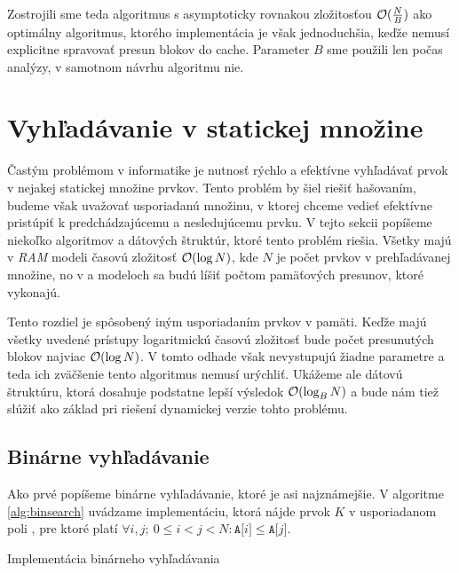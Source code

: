 Zostrojili sme teda \obliv algoritmus s asymptoticky rovnakou zložitosťou $\mathcal{O}(\frac{N}{B})$ ako optimálny \aware algoritmus, ktorého implementácia je však jednoduchšia, keďže nemusí explicitne spravovať presun blokov do cache. Parameter $B$ sme použili len počas analýzy, v samotnom návrhu algoritmu nie.

\section{Vyhľadávanie v statickej množine}
Častým problémom v informatike je nutnosť rýchlo a efektívne vyhľadávať prvok v nejakej statickej množine prvkov. Tento problém by šiel riešiť hašovaním, budeme však uvažovať usporiadanú množinu, v ktorej chceme vedieť efektívne pristúpiť k predchádzajúcemu a nesledujúcemu prvku. V tejto sekcii popíšeme niekoľko algoritmov a dátových štruktúr, ktoré tento problém riešia. Všetky majú v \emph{RAM} modeli časovú zložitosť $\mathcal{O}(\log N)$, kde $N$ je počet prvkov v prehľadávanej množine, no v \aware a \obliv modeloch sa budú líšiť počtom pamäťových presunov, ktoré vykonajú.

Tento rozdiel je spôsobený iným usporiadaním prvkov v pamäti. Keďže majú všetky uvedené prístupy logaritmickú časovú zložitosť bude počet presunutých blokov najviac $\mathcal{O}(\log{N})$. V tomto odhade však nevystupujú žiadne parametre \cache a teda ich zväčšenie tento algoritmus nemusí urýchliť. Ukážeme ale dátovú štruktúru, ktorá dosahuje podstatne lepší výsledok $\mathcal{O}(\log_B{N})$ a bude nám tiež slúžiť ako základ pri riešení dynamickej verzie tohto problému.

\subsection{Binárne vyhľadávanie}
Ako prvé popíšeme binárne vyhľadávanie, ktoré je asi najznámejšie. V algoritme \ref{alg:binsearch} uvádzame implementáciu, ktorá nájde prvok $K$ v usporiadanom poli , pre ktoré platí $\forall i,j;~ 0\le i < j < N: \texttt{A[}i\texttt{]} \le \texttt{A[}j\texttt{]}$.

\begin{algorithm}
    \caption{Implementácia binárneho vyhľadávania}
    \label{alg:binsearch}
    \begin{algorithmic}[1]
                    \State {}
                \Else
                \EndIf
            \EndWhile
            \State {}
        \EndFunction
    \end{algorithmic}
\end{algorithm}

